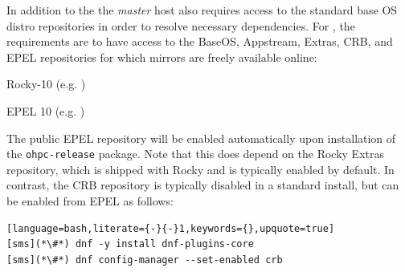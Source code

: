 In addition to the \OHPC{}
\iftoggle{isxCAT}{and \xCAT{} package repositories,}{package repository,}
the {\em master} host also requires access to the standard base OS distro
repositories in order to resolve necessary dependencies. For \baseOS{}, the
requirements are to have access to the BaseOS, Appstream, Extras, CRB,
and EPEL repositories for which mirrors are freely available online:

\begin{itemize*}
\item Rocky-10
  (e.g. \href{http://download.rockylinux.org/pub/rocky/10/}
             {\color{blue}{http://download.rockylinux.org/pub/rocky/10/}} )
\item EPEL 10 (e.g. \href{http://download.fedoraproject.org/pub/epel/10/}
                        {\color{blue}{http://download.fedoraproject.org/pub/epel/10/}} )
\end{itemize*}

\noindent The public EPEL repository will be enabled automatically upon
installation of the \texttt{ohpc-release} package. Note that this does depend
on the Rocky Extras repository, which is shipped with Rocky and is typically
enabled by default.  In contrast, the CRB repository is typically
disabled in a standard install, but can be enabled from EPEL as follows:

\begin{lstlisting}[language=bash,literate={-}{-}1,keywords={},upquote=true]
[sms](*\#*) dnf -y install dnf-plugins-core
[sms](*\#*) dnf config-manager --set-enabled crb
\end{lstlisting}
